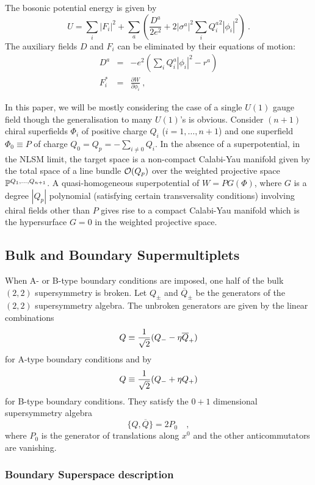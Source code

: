 \documentclass[a4paper,12pt]{article}
\begin{document}
The bosonic potential energy is given by
\begin{equation}
U=\sum_i\left|
F_i\right|^2+
\sum_a\left(
\frac{D^a}{2e^2}+2|\sigma^a|^2
\sum_i{Q^a_i}^2|\phi_i|^2\right)\ .
\label{bosonicpe1}
\end{equation}
The auxiliary fields $D$ and $F_i$ can be eliminated by their
equations of motion:
\begin{eqnarray}
D^a&=&-e^2\left(\sum_iQ^a_i|\phi_i|^2-r^a\right)\nonumber \\
F_i^*&=&\frac{\partial W} {\partial\phi_i}\ ,
\label{dandf}
\end{eqnarray}

In this paper, we will be mostly considering the case of a single $U(1)$ gauge
field though the generalisation to many $U(1)$'s is obvious. 
Consider $(n+1)$ chiral superfields $\Phi_i$ of positive charge $Q_i$
($i=1,\ldots,{n+1}$)
and one superfield $\Phi_0\equiv P$ of charge $Q_0=Q_p=-\sum_{i\neq0}Q_i$. 
In the absence
of a superpotential, in the NLSM limit, the target space is a
non-compact Calabi-Yau manifold given by
the total space of a line bundle ${\cal O}(Q_p)$ over
the weighted projective space $\mathbb P^{Q_1,\ldots,Q_{n+1}}$. 
A quasi-homogeneous superpotential of $W=PG(\Phi)$, where $G$ is a
degree $|Q_p|$ polynomial (satisfying certain transversality
conditions\cite{wittenphases}) involving chiral fields other than $P$ gives
rise to a compact Calabi-Yau manifold which is the  hypersurface $G=0$
in the weighted projective space. 


\subsection{Bulk and Boundary Supermultiplets}
\label{secdecomp}


When A- or B-type boundary conditions are imposed, one half
of the bulk $(2,2)$ supersymmetry is broken. Let $Q_{\pm}$ and
$\overline{Q}_{\pm}$ be the generators of the $(2,2)$ supersymmetry
algebra. The unbroken generators are given by the linear combinations
$$ Q \equiv {1\over\sqrt2} (Q_- - \eta \overline{Q}_+) $$  for A-type
boundary conditions and by $$Q \equiv {1\over\sqrt2} (Q_- + \eta Q_+)$$ 
for B-type boundary conditions. They
satisfy the $0+1$ dimensional supersymmetry algebra
$$
\{Q,\overline{Q}\} = 2 P_0 \quad,
$$
where $P_0$ is the generator of translations along $x^0$ and the
other anticommutators are vanishing.  

\subsubsection{Boundary Superspace description}
\end{document}
